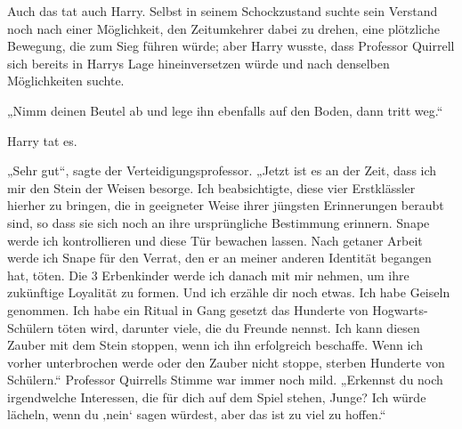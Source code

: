 Auch das tat auch Harry. Selbst in seinem Schockzustand suchte sein Verstand noch nach einer Möglichkeit, den Zeitumkehrer dabei zu drehen, eine plötzliche Bewegung, die zum Sieg führen würde; aber Harry wusste, dass Professor Quirrell sich bereits in Harrys Lage hineinversetzen würde und nach denselben Möglichkeiten suchte.

„Nimm deinen Beutel ab und lege ihn ebenfalls auf den Boden, dann tritt weg.“

Harry tat es.

„Sehr gut“, sagte der Verteidigungsprofessor.
„Jetzt ist es an der Zeit, dass ich mir den Stein der Weisen besorge. Ich beabsichtigte, diese vier Erstklässler hierher zu bringen, die in geeigneter Weise ihrer jüngsten Erinnerungen beraubt sind, so dass sie sich noch an ihre ursprüngliche Bestimmung erinnern. Snape werde ich kontrollieren und diese Tür bewachen lassen. Nach getaner Arbeit werde ich Snape für den Verrat, den er an meiner anderen Identität begangen hat, töten. Die 3 Erbenkinder werde ich danach mit mir nehmen, um ihre zukünftige Loyalität zu formen. Und ich erzähle dir noch etwas. Ich habe Geiseln genommen. Ich habe ein Ritual in Gang gesetzt das Hunderte von Hogwarts-Schülern töten wird, darunter viele, die du Freunde nennst. Ich kann diesen Zauber mit dem Stein stoppen, wenn ich ihn erfolgreich beschaffe. Wenn ich vorher unterbrochen werde oder den Zauber nicht stoppe, sterben Hunderte von Schülern.“ Professor Quirrells Stimme war immer noch mild.
„Erkennst du noch irgendwelche Interessen, die für dich auf dem Spiel stehen, Junge? Ich würde lächeln, wenn du ‚nein‘ sagen würdest, aber das ist zu viel zu hoffen.“

